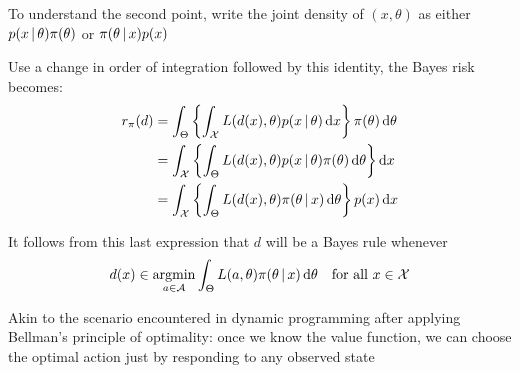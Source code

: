 \begin{frame}

    \vspace{2em}
    To understand the second point, write the joint density of
    $(x, \theta)$ as either $p(x \, | \, \theta) \pi(\theta)$ or 
    $\pi(\theta \, | \, x) p(x)$
    
    Use a change in order of integration followed by this identity,
    the Bayes risk becomes:
    \begin{align*}
        r_\pi(d) 
        & = \int_\Theta 
            \left\{
                \int_\mathcal X
                L(d(x), \theta) p(x \, | \, \theta)
                \mathop{}\!\mathrm{d} x
            \right\}
            \pi(\theta) 
            \mathop{}\!\mathrm{d} \theta   
        \\
        & = \int_\mathcal X 
            \left\{
                \int_\Theta
                L(d(x), \theta) p(x \, | \, \theta) \pi(\theta) 
                \mathop{}\!\mathrm{d} \theta   
            \right\}
                \mathop{}\!\mathrm{d} x
        \\
        & = \int_\mathcal X 
            \left\{
                \int_\Theta
                L(d(x), \theta) \pi(\theta \, | \, x) 
                \mathop{}\!\mathrm{d} \theta   
            \right\}
                p(x)
                \mathop{}\!\mathrm{d} x
    \end{align*}
    
\end{frame}

\begin{frame}

    \vspace{2em}
    It follows from this last expression that $d$ will be a Bayes rule whenever 
    \begin{equation}
        \label{eq:bmv}
        d(x) \in \argmin_{a \in \aA} 
                \int_\Theta
                L(a, \theta) \pi(\theta \given x) 
                \diff \theta   
                \quad \text{for all $x \in \xX$}
    \end{equation}
    
    \vspace{.7em}
    Akin to the scenario encountered in dynamic
    programming after applying Bellman's principle of optimality:  once we know
    the value function, we can choose the optimal action just by responding to any 
    observed state
\end{frame}

